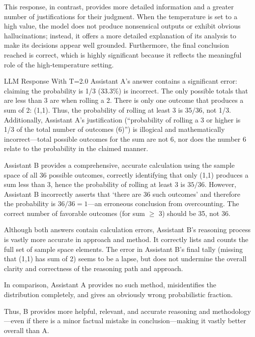 \documentclass[11pt]{article}
\begin{document}
This response, in contrast, provides more detailed information and a greater number of justifications for their judgment. When the temperature is set to a high value, the model does not produce nonsensical outputs or exhibit obvious hallucinations; instead, it offers a more detailed explanation of its analysis to make its decisions appear well grounded. Furthermore, the final conclusion reached is correct, which is highly significant because it reflects the meaningful role of the high‑temperature setting.

\begin{responsebox}{LLM Response With T=2.0}
Assistant A's answer contains a significant error: claiming the probability is 1/3 (33.3\%) is
incorrect. The only possible totals that are less than 3 are when rolling a 2. There is only one
outcome that produces a sum of 2: (1,1). Thus, the probability of rolling at least 3 is $35/36$, not
1/3. Additionally, Assistant A's justification (``probability of rolling a 3 or higher is 1/3 of the
total number of outcomes (6)'') is illogical and mathematically incorrect---total possible outcomes for
the sum are not 6, nor does the number 6 relate to the probability in the claimed manner.

Assistant B provides a comprehensive, accurate calculation using the sample space of all 36 possible
outcomes, correctly identifying that only (1,1) produces a sum less than 3, hence the probability of
rolling at least 3 is $35/36$. However, Assistant B incorrectly asserts that `there are 36 such
outcomes' and therefore the probability is $36/36=1$---an erroneous conclusion from overcounting. The
correct number of favorable outcomes (for sum $\geq$ 3) should be 35, not 36.

Although both answers contain calculation errors, Assistant B's reasoning process is vastly more
accurate in approach and method. It correctly lists and counts the full set of sample space
elements. The error in Assistant B's final tally (missing that (1,1) has sum of 2) seems to be a
lapse, but does not undermine the overall clarity and correctness of the reasoning path and
approach.

In comparison, Assistant A provides no such method, misidentifies the distribution completely, and
gives an obviously wrong probabilistic fraction.

Thus, B provides more helpful, relevant, and accurate reasoning and methodology---even if there is a
minor factual mistake in conclusion---making it vastly better overall than A.
\end{responsebox}
\end{document}
